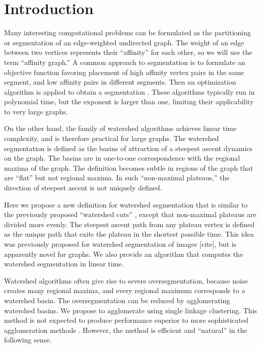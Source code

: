 \documentclass{article}
\begin{document}

\section{Introduction}
Many interesting computational problems can be formulated as the
partitioning or segmentation of an edge-weighted undirected graph.
The weight of an edge between two vertices represents their
``affinity'' for each other, so we will use the term ``affinity
graph.''  A common approach to segmentation is to formulate an
objective function favoring placement of high affinity vertex pairs in
the same segment, and low affinity pairs in different segments.  Then
an optimization algorithm is applied to obtain a segmentation
\cite{shi2000normalized,kolmogorov2002energy}.  These algorithms
typically run in polynomial time, but the exponent is larger than one,
limiting their applicability to very large graphs.

On the other hand, the family of watershed algorithms achieves linear
time complexity, and is therefore practical for large graphs.  The
watershed segmentation is defined as the basins of attraction of a
steepest ascent dynamics on the graph.  The basins are in one-to-one
correspondence with the regional maxima of the graph.  The definition
becomes subtle in regions of the graph that are ``flat'' but not
regional maxima.  In such ``non-maximal plateaus,'' the direction of
steepest ascent is not uniquely defined.

Here we propose a new definition for watershed segmentation that is
similar to the previously proposed ``watershed cuts''
\cite{Cousty2009,Cousty2010}, except that non-maximal plateaus are
divided more evenly.  The steepest ascent path from any plateau vertex
is defined as the unique path that exits the plateau in the shortest
possible time.  This idea was previously proposed for watershed
segmentation of images [cite], but is apparently novel for graphs.  We
also provide an algorithm that computes the watershed segmentation in
linear time.

Watershed algorithms often give rise to severe oversegmentation,
because noise creates many regional maxima, and every regional maximum
corresponds to a watershed basin. The oversegmentation can be reduced
by agglomerating watershed basins.  We propose to agglomerate using
single linkage clustering.  This method is not expected to produce
performance superior to more sophisticated agglomeration methods
\cite{beucher1994watershed}.  However, the method is efficient and
``natural'' in the following sense.
\end{document}
